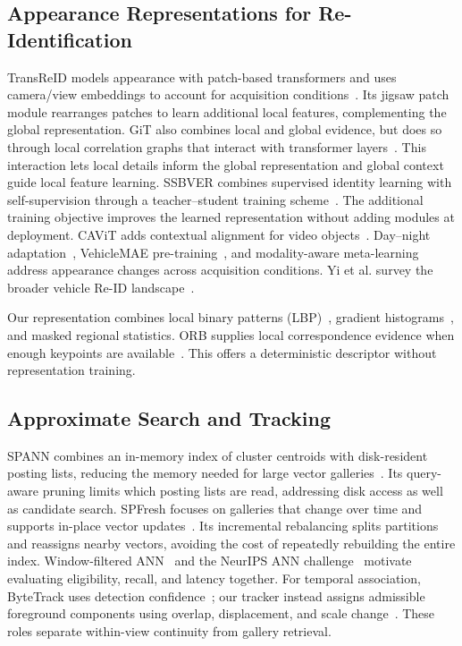 \documentclass[conference]{IEEEtran}
\begin{document}
\subsection{Appearance Representations for Re-Identification}
TransReID models appearance with patch-based transformers and uses camera/view embeddings to account for acquisition conditions~\cite{transreid2021}. Its jigsaw patch module rearranges patches to learn additional local features, complementing the global representation. GiT also combines local and global evidence, but does so through local correlation graphs that interact with transformer layers~\cite{git2023}. This interaction lets local details inform the global representation and global context guide local feature learning. SSBVER combines supervised identity learning with self-supervision through a teacher--student training scheme~\cite{ssbver2023}. The additional training objective improves the learned representation without adding modules at deployment. CAViT adds contextual alignment for video objects~\cite{cavit2022}. Day--night adaptation~\cite{daynight2024}, VehicleMAE pre-training~\cite{vehiclemae2025}, and modality-aware meta-learning~\cite{kamenou2023} address appearance changes across acquisition conditions. Yi et al. survey the broader vehicle Re-ID landscape~\cite{yi2025survey}.

Our representation combines local binary patterns (LBP)~\cite{ojala2002}, gradient histograms~\cite{dalal2005}, and masked regional statistics. ORB supplies local correspondence evidence when enough keypoints are available~\cite{orb2011}. This offers a deterministic descriptor without representation training.

\subsection{Approximate Search and Tracking}
SPANN combines an in-memory index of cluster centroids with disk-resident posting lists, reducing the memory needed for large vector galleries~\cite{spann2021}. Its query-aware pruning limits which posting lists are read, addressing disk access as well as candidate search. SPFresh focuses on galleries that change over time and supports in-place vector updates~\cite{spfresh2023}. Its incremental rebalancing splits partitions and reassigns nearby vectors, avoiding the cost of repeatedly rebuilding the entire index. Window-filtered ANN~\cite{windowann2024} and the NeurIPS ANN challenge~\cite{annchallenge2022} motivate evaluating eligibility, recall, and latency together. For temporal association, ByteTrack uses detection confidence~\cite{bytetrack2022}; our tracker instead assigns admissible foreground components using overlap, displacement, and scale change~\cite{scipylsa}. These roles separate within-view continuity from gallery retrieval.
\end{document}
